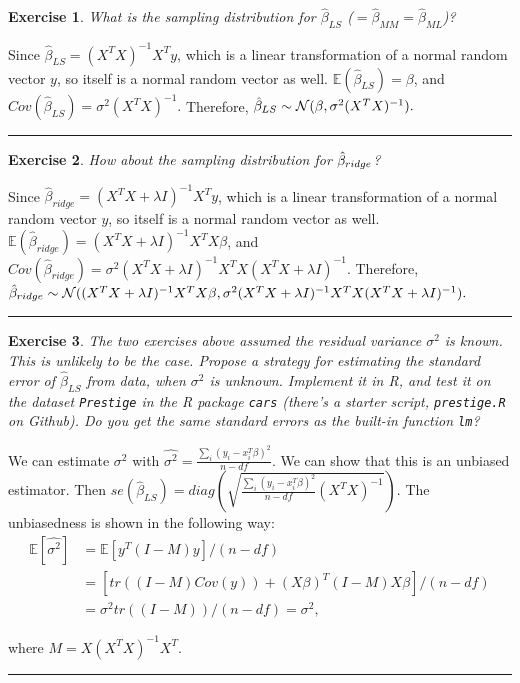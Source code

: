 \documentclass[twoside]{article}
\newcounter{lecnum}
\newtheorem{exercise}{Exercise}[lecnum]
\newenvironment{proof}{{\bf Proof:}}{\hfill\rule{2mm}{2mm}}
\newcommand\E{\mathbb{E}}
\begin{document}
\begin{exercise}
  What is the sampling distribution for $\hat{\beta}_{LS}$ ($=\hat{\beta}_{MM}=\hat{\beta}_{ML}$)?
\end{exercise}
\begin{proof}
Since $\hat{\beta}_{LS} = (X^TX)^{-1}X^Ty$, which is a linear transformation of a normal random vector $y$, so itself is a normal random vector as well.
$\E(\hat{\beta}_{LS}) = \beta$, and $Cov(\hat{\beta}_{LS}) = \sigma^2(X^TX)^{-1}.$
Therefore, $\hat{\beta}_{LS}\sim {\cal N}( \beta,\sigma^2(X^TX)^{-1}).$
\end{proof}
\begin{exercise}
  How about the sampling distribution for $\hat{\beta}_{\small{ridge}}$?
\end{exercise}
\begin{proof}
Since $\hat{\beta}_{ridge} = (X^TX+\lambda I)^{-1}X^Ty$, which is a linear transformation of a normal random vector $y$, so itself is a normal random vector as well.
$\E(\hat{\beta}_{ridge}) = (X^TX+\lambda I)^{-1}X^TX\beta$, and $Cov(\hat{\beta}_{ridge}) = \sigma^2(X^TX+\lambda I)^{-1}X^TX(X^TX+\lambda I)^{-1}.$
Therefore, $\hat{\beta}_{ridge}\sim {\cal N}( (X^TX+\lambda I)^{-1}X^TX\beta,\sigma^2(X^TX+\lambda I)^{-1}X^TX(X^TX+\lambda I)^{-1}).$
\end{proof}

\begin{exercise}
  The two exercises above assumed the residual variance $\sigma^2$ is known. This is unlikely to be the case. Propose a strategy for estimating the standard error of $\hat{\beta}_{LS}$ from data, when $\sigma^2$ is unknown. Implement it in R, and test it on the dataset \texttt{Prestige} in the R package \texttt{cars} (there's a starter script, \texttt{prestige.R} on Github). Do you get the same standard errors as the built-in function \texttt{lm}?
\end{exercise}

\begin{proof}
We can estimate $\sigma^2$ with $\hat{\sigma^2} = \frac{\sum_i(y_i-x_i^T\beta)^2}{n-df}$. We can show that this is an unbiased estimator. Then $se(\hat{\beta}_{LS}) = diag(\sqrt{\frac{\sum_i(y_i-x_i^T\beta)^2}{n-df}(X^TX)^{-1}}).$ The unbiasedness is shown in the following way:
\begin{equation*}
\begin{split}
\E [\hat{\sigma^2}] &= \E[y^T(I-M)y]/(n-df) \\
&= [tr((I-M)Cov(y))+(X\beta)^T(I-M)X\beta]/(n-df)\\
&= \sigma ^2 tr((I-M))/(n-df) = \sigma^2,
\end{split}
\end{equation*}

where $M = X(X^TX)^{-1}X^T.$

\end{proof}
\end{document}
